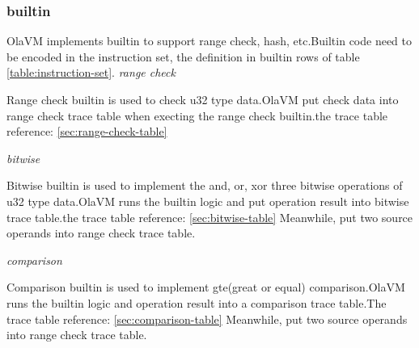 \subsubsection{builtin}\label{subsec: instructions-builtin}
OlaVM implements builtin to support range check, hash, etc.Builtin code need to be encoded in the instruction set, the definition in builtin rows of table \ref{table:instruction-set}.
\emph{range check}

Range check builtin is used to check u32 type data.OlaVM put check data into range check trace table when execting the range check builtin.the trace table reference: \ref{sec:range-check-table}

\emph{bitwise}

Bitwise builtin is used to implement the and, or, xor three bitwise operations of u32 type data.OlaVM runs the builtin logic and put operation result into bitwise trace table.the trace table reference: \ref{sec:bitwise-table}
Meanwhile, put two source operands into range check trace table.

\emph{comparison}

Comparison builtin is used to implement gte(great or equal) comparison.OlaVM runs the builtin logic and operation result into a comparison trace table.The trace table reference: \ref{sec:comparison-table}
Meanwhile, put two source operands into range check trace table.